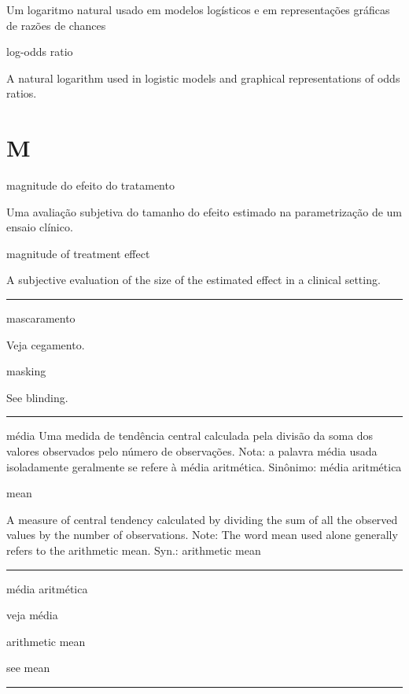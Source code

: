 \documentclass[
  openany]{book}
\begin{document}
Um logaritmo natural usado em modelos logísticos e em representações gráficas de razões de chances

log-odds ratio

A natural logarithm used in logistic models and graphical representations of odds ratios.

\hypertarget{m}{%
\chapter*{M}\label{m}}

magnitude do efeito do tratamento

Uma avaliação subjetiva do tamanho do efeito estimado na parametrização de um ensaio clínico.

magnitude of treatment effect

A subjective evaluation of the size of the estimated effect in a clinical setting.

\begin{center}\rule{0.5\linewidth}{0.5pt}\end{center}

mascaramento

Veja cegamento.

masking

See blinding.

\begin{center}\rule{0.5\linewidth}{0.5pt}\end{center}

média
Uma medida de tendência central calculada pela divisão da soma dos valores observados pelo número de observações. Nota: a palavra média usada isoladamente geralmente se refere à média aritmética. Sinônimo: média aritmética

mean

A measure of central tendency calculated by dividing the sum of all the observed values by the number of observations. Note: The word mean used alone generally refers to the arithmetic mean. Syn.: arithmetic mean

\begin{center}\rule{0.5\linewidth}{0.5pt}\end{center}

média aritmética

veja média

arithmetic mean

see mean

\begin{center}\rule{0.5\linewidth}{0.5pt}\end{center}
\end{document}
